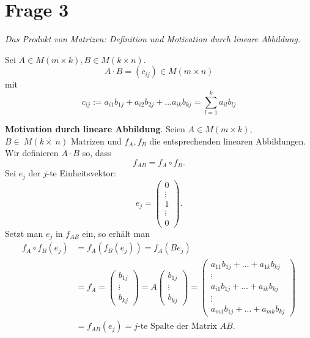 \section{Frage 3}
\textit{Das Produkt von Matrizen: Definition und Motivation durch
lineare Abbildung.}

\begin{definition}
    Sei $A\in M(m\times k), B\in M(k\times n)$.
    \[
        A\cdot B = (c_{ij})\in M(m\times n)  
    \]
    mit
    \[
        c_{ij} :=a_{i1}b_{1j} + a_{i2}b_{2j}+ \dots a_{ik}b_{kj}
    = \sum_{l=1}^{k}a_{il}b_{lj}
    \]
\end{definition}

\textbf{Motivation durch lineare Abbildung}. Seien $A\in M(m\times k)$,
$B\in~M(k\times~n)$ Matrizen und $f_A, f_B$ die entsprechenden 
linearen Abbildungen. Wir definieren $A\cdot B$ so, dass
\[
    f_{AB}=f_A\circ f_B
.\]
Sei $e_j$ der $j$-te Einheitsvektor:
\[
    e_j=\begin{pmatrix}
        0\\ \vdots\\ 1\\ \vdots\\ 0
    \end{pmatrix}
.\]
Setzt man $e_j$ in $f_{AB}$ ein, so erhält man
\begin{align*}
    f_A \circ f_B (e_j) &= f_A(f_B(e_j)) = f_A(Be_j)\\
    &=f_A=\begin{pmatrix}
        b_{1j}\\ \vdots\\ b_{kj}
    \end{pmatrix} = A \begin{pmatrix}
        b_{1j}\\ \vdots\\ b_{kj}
    \end{pmatrix} = \begin{pmatrix}
        a_{11}b_{1j} + \dots + a_{1k}b_{kj}\\
        \vdots\\
        a_{i1}b_{1j} + \dots + a_{ik}b_{kj}\\
        \vdots\\
        a_{m1}b_{1j} + \dots + a_{mk}b_{kj}
    \end{pmatrix}\\
    &= f_{AB}(e_j) = j\text{-te Spalte der Matrix }AB
.\end{align*}
